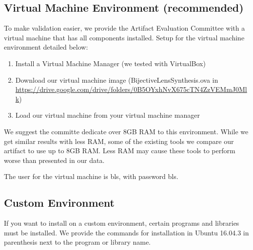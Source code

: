 \documentclass[sigplan,acmsmall]{acmart}
\begin{document}
\subsection{Virtual Machine Environment (recommended)}
To make validation easier, we provide the Artifact Evaluation Committee with a
virtual machine that has all components installed.  Setup for the virtual
machine environment detailed below:
\begin{enumerate}
\item Install a Virtual Machine Manager (we tested with VirtualBox)
\item Download our virtual machine image (BijectiveLensSynthesis.ova in\\
  {\color{blue}
    \url{https://drive.google.com/drive/folders/0B5OYxhNvX675cTN4ZzVEMmJ0Mlk})}
\item Load our virtual machine from your virtual machine manager
\end{enumerate}

We suggest the committe dedicate over 8GB RAM to this environment.
While we get similar results with less RAM, some of the existing tools we
compare our artifact to use up to 8GB RAM.  Less RAM may cause these tools to
perform worse than presented in our data.

The user for the virtual machine is bls, with password bls.

\subsection{Custom Environment}
If you want to install on a custom environment, certain programs and libraries
must be installed.  We provide the commands for installation in Ubuntu 16.04.3
in parenthesis next to the program or library name.
\end{document}
